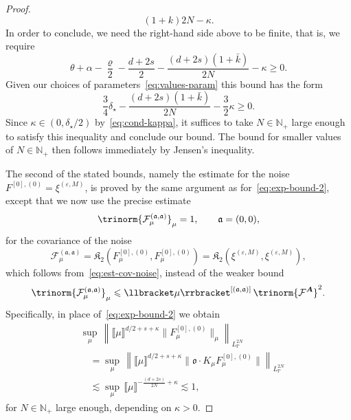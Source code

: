 \documentclass{article}
\numberwithin{equation}{section}
\theoremstyle{plain}
\theoremstyle{definition}
\begin{document}
\begin{proof}
\begin{equation}
{{    (1 + k)}{2 N} - \kappa} . \label{eq:exp-bound-2}
  \end{equation}
  In order to conclude, we need the right-hand side above to be finite, that
  is, we require
  \begin{equation}
    \theta + \alpha - \frac{\varrho}{2} - \frac{d + 2 s}{2} - \frac{(d + 2 s)
    (1 + \bar{k})}{2 N} - \kappa \geqslant 0.
    \label{eq:wanted-bound}
  \end{equation}
  Given our choices of parameters~\eqref{eq:values-param} this bound has the
  form
  \begin{equation}
    \frac{3}{4} \delta_{\star} - \frac{(d + 2 s)
    (1 + \bar{k})}{2 N} - \frac{3}{2} \kappa \geqslant 0.
    \label{eq:smallness-conditions}
  \end{equation}
  Since $\kappa \in (0, \delta_{\star} / 2)$ by~\eqref{eq:cond-kappa}, it
  suffices to take $N \in \mathbb{N}_+$ large enough to satisfy this
  inequality and conclude our bound. The bound for smaller values of $N \in
  \mathbb{N}_+$ then follows immediately by Jensen's inequality.
  
  The second of the stated bounds, namely the estimate for the noise $F^{[0],
  (0)} = \xi^{(\varepsilon, M)} $, is proved by the same argument as
  for~\eqref{eq:exp-bound-2}, except that we now use the precise estimate
  \[ \trinorm{ \mathcal{F}^{(\mathfrak{a}, \mathfrak{a})}_{\mu}}_{\mu} = 1,\qquad \mathfrak{a}=
  (0, 0), \]
  for the covariance of the noise
  \[ \mathcal{F}^{(\mathfrak{a}, \mathfrak{a})}_{\mu} =\mathfrak{K}_2(F_\mu^{[0], (0)},F_\mu^{[0], (0)})
  =
     \mathfrak{K}_2(\xi^{(\varepsilon, M)} , \xi^{(\varepsilon, M)} ),
      \]
  which follows from~\eqref{eq:est-cov-noise}, instead of the weaker bound
  \[ \trinorm{ \mathcal{F}^{(\mathfrak{a}, \mathfrak{a})}_{\mu}}_{\mu}
     \leqslant 
     \llbracket
     \mu \rrbracket^{[(\mathfrak{a}, \mathfrak{a})]}\,
     \trinorm{ \mathcal{F}^{\boldsymbol{A}} }^2 . \]
  Specifically, in place of~\eqref{eq:exp-bound-2} we obtain
  \begin{align*}
     &\sup_{\mu}\, \left\| \llbracket \mu \rrbracket^{d / 2 + s + \kappa}
     \| F_\mu^{[0], (0)} \|_{\mu} \right\|_{L^{2 N}_{\mathbb{P}}}\\
     &\quad =
     \sup_{\mu}\, \left\| \llbracket \mu \rrbracket^{d / 2 + s + \kappa}
     \| \mathfrak{o}\cdot K_{\mu} F_\mu^{[0], (0)} \| \right\|_{L^{2 N}_{\mathbb{P}}}\\
     &\quad \lesssim \sup_{\mu}\,
     \llbracket \mu \rrbracket^{- \frac{(d + 2 s)}{2 N} + \kappa}
     \lesssim 1,
  \end{align*}
  for $N \in \mathbb{N}_+$ large enough, depending on $\kappa > 0$.
\end{proof}
\end{document}
